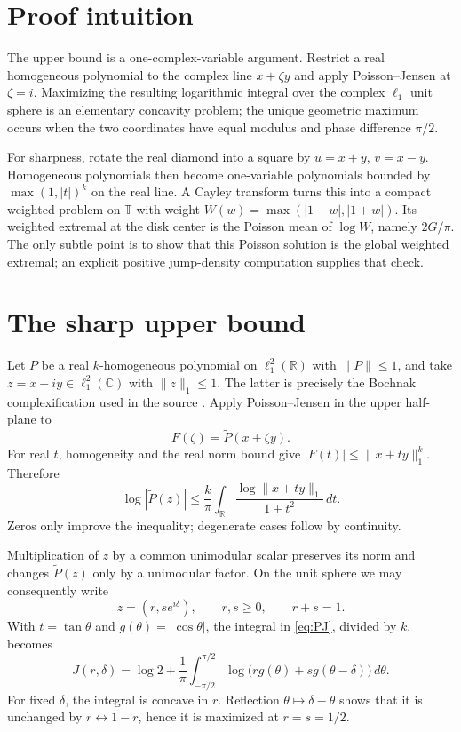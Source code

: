 \documentclass[11pt]{article}
\newcommand{\R}{\mathbb R}
\newcommand{\C}{\mathbb C}
\newcommand{\T}{\mathbb T}
\begin{document}
\section{Proof intuition}

The upper bound is a one-complex-variable argument.  Restrict a real
homogeneous polynomial to the complex line $x+\zeta y$ and apply
Poisson--Jensen at $\zeta=i$.  Maximizing the resulting logarithmic integral
over the complex $\ell_1$ unit sphere is an elementary concavity problem; the
unique geometric maximum occurs when the two coordinates have equal modulus
and phase difference $\pi/2$.

For sharpness, rotate the real diamond into a square by
$u=x+y$, $v=x-y$.  Homogeneous polynomials then become one-variable
polynomials bounded by $\max(1,|t|)^k$ on the real line.  A Cayley transform
turns this into a compact weighted problem on $\T$ with weight
$W(w)=\max(|1-w|,|1+w|)$.  Its weighted extremal at the disk center is the
Poisson mean of $\log W$, namely $2G/\pi$.  The only subtle point is to show
that this Poisson solution is the global weighted extremal; an explicit
positive jump-density computation supplies that check.

\section{The sharp upper bound}

Let $P$ be a real $k$-homogeneous polynomial on $\ell_1^2(\R)$ with
$\|P\|\le1$, and take $z=x+iy\in\ell_1^2(\C)$ with $\|z\|_1\le1$.
The latter is precisely the Bochnak complexification used in the source
\cite[p.~3]{RodriguezSource}.  Apply Poisson--Jensen in the upper half-plane
to
\[
 F(\zeta)=\widetilde P(x+\zeta y).
\]
For real $t$, homogeneity and the real norm bound give
$|F(t)|\le\|x+ty\|_1^k$.  Therefore
\begin{equation}\label{eq:PJ}
 \log|\widetilde P(z)|
 \le \frac{k}{\pi}\int_{\R}
       \frac{\log\|x+ty\|_1}{1+t^2}\,dt.
\end{equation}
Zeros only improve the inequality; degenerate cases follow by continuity.

Multiplication of $z$ by a common unimodular scalar preserves its norm and
changes $\widetilde P(z)$ only by a unimodular factor.  On the unit sphere we
may consequently write
\[
 z=(r,se^{i\delta}),\qquad r,s\ge0,\qquad r+s=1.
\]
With $t=\tan\theta$ and $g(\theta)=|\cos\theta|$, the integral in
\eqref{eq:PJ}, divided by $k$, becomes
\begin{equation}\label{eq:J}
 J(r,\delta)=\log2+\frac1\pi\int_{-\pi/2}^{\pi/2}
 \log\bigl(rg(\theta)+s g(\theta-\delta)\bigr)\,d\theta.
\end{equation}
For fixed $\delta$, the integral is concave in $r$.  Reflection
$\theta\mapsto\delta-\theta$ shows that it is unchanged by
$r\leftrightarrow1-r$, hence it is maximized at $r=s=1/2$.
\end{document}

